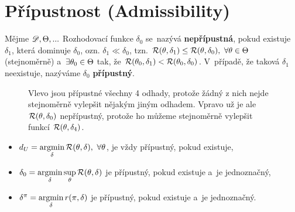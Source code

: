 \section{Přípustnost (Admissibility)}
\begin{define}
	Mějme $\mathscr{D} ,\Theta,...$ Rozhodovací funkce $\delta_0$ se~nazývá \textbf{nepřípustná}, pokud existuje $\delta_1$, která dominuje $\delta_0$, ozn. $\delta_1\ll\delta_0$, tzn. $\mathcal{R}(\theta,\delta_1)\leq\mathcal{R}(\theta,\delta_0),~\forall\theta\in\Theta$ (stejnoměrně) a~$\exists\theta_0\in\Theta$ tak, že $\mathcal{R}(\theta_0,\delta_1)<\mathcal{R}(\theta_0,\delta_0)$. V~případě, že taková $\delta_1$ neexistuje, nazýváme $\delta_0$ \textbf{přípustný}.
	
	\begin{figure}[h]
		\centering
		\caption{Vlevo jsou přípustné všechny 4 odhady, protože žádný z nich nejde stejnoměrně vylepšit nějakým jiným odhadem. Vpravo už je ale $\mathcal{R}(\theta,\delta_0)$ nepřípustný, protože ho můžeme stejnoměrně vylepšit funkcí $\mathcal{R}(\theta,\delta_4)$.}
		\label{fig:92}
	\end{figure}
	
\end{define}
\begin{theorem}\label{veta_pripustna}
	\begin{itemize}
	\item  $d_U=\mathop{\mathrm{argmin}}\limits_\delta\mathcal{R}(\theta,\delta),~\forall\theta$, je vždy přípustný, pokud existuje, \item  $\delta_0=\mathop{\mathrm{argmin}}\limits_\delta\sup\limits_\theta\mathcal{R}(\theta,\delta)$ je přípustný, pokud existuje a~je jednoznačný, \item  $\delta^\pi=\mathop{\mathrm{argmin}}\limits_\delta r(\pi,\delta)$ je přípustný, pokud existuje a~je jednoznačný.
\end{itemize}
\end{theorem}

